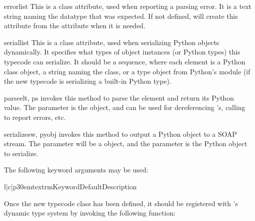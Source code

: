 \begin{memberdesc}{errorlist}
This is a class attribute, used when reporting a parsing error.
It is a text string naming the datatype that was expected.
If not defined, \ZSI{} will create this attribute from the 
attribute when it is needed.
\end{memberdesc}

\begin{memberdesc}{seriallist}
This is a class attribute, used when serializing Python objects
dynamically.
It specifies what types of object instances (or Python types) this
typecode can serialize.
It should be a sequence, where each element is a Python class object,
a string naming the class, or a type object from Python's 
module (if the
new typecode is serializing a built-in Python type).
\end{memberdesc}

\begin{methoddesc}{parse}{elt, ps}
\ZSI{} invokes this method to
parse the  element and return its Python value.
The  parameter is the  object, and can be
used for dereferencing 's, calling  to
report errors, etc.
\end{methoddesc}

\begin{methoddesc}{serialize}{sw, pyobj}
\ZSI{} invokes this method to output a Python object to a SOAP stream.
The  parameter will be a  object, and
the  parameter is the Python object to serialize.

The following keyword arguments may be used:

\begin{tableiii}{l|c|p{30em}}{textrm}{Keyword}{Default}{Description}
\end{tableiii}
\end{methoddesc}

Once the new typecode class has been defined, it should be registered with
\ZSI{}'s dynamic type system by invoking the following function:

